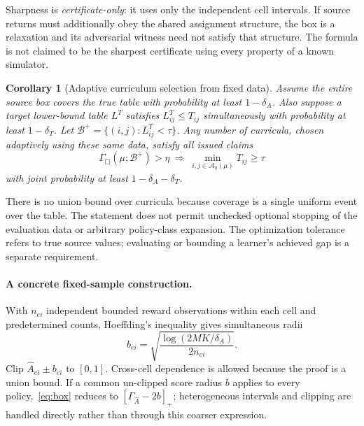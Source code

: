 \documentclass[11pt]{article}
\newtheorem{corollary}[theorem]{Corollary}
\theoremstyle{definition}\newtheorem{definition}[theorem]{Definition}
\newcommand{\1}{\mathbf{1}}
\newcommand{\bad}{\mathcal B}
\newcommand{\nearset}{\mathcal A}
\newcommand{\Gam}{\Gamma}
\begin{document}
Sharpness is \emph{certificate-only}: it uses only the independent cell intervals. If source returns must additionally obey the shared assignment structure, the box is a relaxation and its adversarial witness need not satisfy that structure. The formula is not claimed to be the sharpest certificate using every property of a known simulator.

\begin{corollary}[Adaptive curriculum selection from fixed data]\label{cor:adaptive}
Assume the entire source box covers the true table with probability at least $1-\delta_A$. Also suppose a target lower-bound table $L^T$ satisfies $L^T_{ij}\leq T_{ij}$ simultaneously with probability at least $1-\delta_T$. Let $\bad^+=\{(i,j):L^T_{ij}<\tau\}$. Any number of curricula, chosen adaptively using these same data, satisfy all issued claims
\begin{equation}
 \Gam_{\Box}(\mu;\bad^+)>\eta
 \ \Longrightarrow\ 
 \min_{i,j\in\nearset_\eta(\mu)}T_{ij}\geq\tau
\end{equation}
with joint probability at least $1-\delta_A-\delta_T$.
\end{corollary}
There is no union bound over curricula because coverage is a single uniform event over the table. The statement does not permit unchecked optional stopping of the evaluation data or arbitrary policy-class expansion. The optimization tolerance refers to true source values; evaluating or bounding a learner's achieved gap is a separate requirement.

\paragraph{A concrete fixed-sample construction.}
With $n_{ei}$ independent bounded reward observations within each cell and predetermined counts, Hoeffding's inequality \citep{hoeffding1963} gives simultaneous radii
\begin{equation}
 b_{ei}=\sqrt{\frac{\log(2MK/\delta_A)}{2n_{ei}}}.
\end{equation}
Clip $\widehat A_{ei}\pm b_{ei}$ to $[0,1]$. Cross-cell dependence is allowed because the proof is a union bound. If a common un-clipped score radius $b$ applies to every policy,~\eqref{eq:box} reduces to $[\Gam_{\widehat A}-2b]_+$; heterogeneous intervals and clipping are handled directly rather than through this coarser expression.
\end{document}
